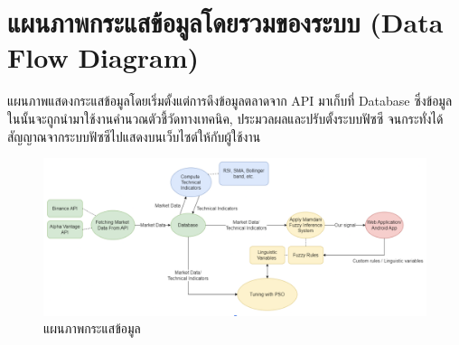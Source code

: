 \section{แผนภาพกระแสข้อมูลโดยรวมของระบบ (Data Flow Diagram)}
แผนภาพแสดงกระแสข้อมูลโดยเริ่มตั้งแต่การดึงข้อมูลตลาดจาก API มาเก็บที่ Database ซึ่งข้อมูลในนั้นจะถูกนำมาใช้งานคำนวณตัวชี้วัดทางเทคนิค, ประมวลผลและปรับตั้งระบบฟัซซี จนกระทั่งได้สัญญาณจากระบบฟัซซีไปแสดงบนเว็บไซต์ให้กับผู้ใช้งาน
\begin{figure}[ht]
    \centering
    \includegraphics[scale=0.3]{images/overview.png}
    \caption{แผนภาพกระแสข้อมูล}
    \label{fig:11}
\end{figure}